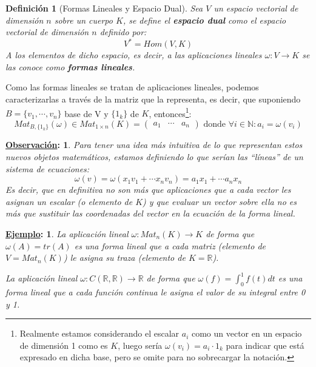 \documentclass[10pt,a4paper,openright]{book}
\theoremstyle{break}
\newtheorem*{defi}{Definición}
\newtheorem*{obs}{\underline{Observación}:}
\newtheorem*{ej}{\underline{Ejemplo}:}
\begin{document}
\begin{defi}[Formas Lineales y Espacio Dual]
Sea $V$ un espacio vectorial de dimensión $n$ sobre un cuerpo $K$, se define el \textbf{espacio dual} como el espacio vectorial de dimensión $n$ definido por:
$$V^* = Hom(V,K)$$
A los elementos de dicho espacio, es decir, a las aplicaciones lineales $\omega: V\rightarrow K$ se las conoce como \textbf{formas lineales}.
\end{defi}
Como las formas lineales se tratan de aplicaciones lineales, podemos caracterizarlas a través de la matriz que la representa, es decir, que suponiendo $B = \{v_1, \cdots, v_n\}$ base de V y $\{1_k\}$ de $K$, entonces\footnote{Realmente estamos considerando el escalar $a_i$ como un vector en un espacio de dimensión 1 como es $K$, luego sería $\omega(v_i) = a_i \cdot 1_k$ para indicar que está expresado en dicha base, pero se omite para no sobrecargar la notación.}:
$$Mat_{B,\{1_k\}}(\omega)\in Mat_{1\times n}(K)=\begin{pmatrix} a_1 & \cdots & a_n \end{pmatrix} \mbox{ donde } \forall i \in \mathbb{N}: a_i = \omega (v_i)$$

\begin{obs}
Para tener una idea más intuitiva de lo que representan estos nuevos objetos matemáticos, estamos definiendo lo que serían las ``líneas'' de un sistema de ecuaciones:
$$\omega(v)=\omega(x_1v_1+\cdots x_nv_n)=a_1x_1+\cdots a_nx_n$$
Es decir, que en definitiva no son más que aplicaciones que a cada vector les asignan un escalar (o elemento de $K$) y que evaluar un vector sobre ella no es más que sustituir las coordenadas del vector en la ecuación de la forma lineal.
\end{obs}

\begin{ej}
La aplicación lineal $\omega: Mat_n(K)\rightarrow K$ de forma que $\omega(A)=tr(A)$ es una forma lineal que a cada matriz (elemento de $V = Mat_n(K)$) le asigna su traza (elemento de $K=\mathbb{R}$).

La aplicación lineal $\omega: C(\mathbb R, \mathbb R)\rightarrow \mathbb R$ de forma que $\omega(f)=\int_0^1 f(t)dt$ es una forma lineal que a cada función continua le asigna el valor de su integral entre 0 y 1.
\end{ej}
\end{document}
